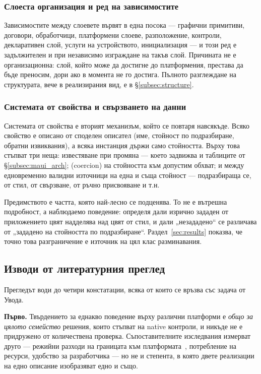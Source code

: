 \subsubsection{Слоеста организация и ред на зависимостите}
Зависимостите между слоевете вървят в една посока --- графични примитиви, договори,
обработчици, платформени слоеве, разположение, контроли, декларативен слой, услуги на
устройството, инициализация --- и този ред е задължителен и при независимо изграждане на
такъв слой. Причината не е организационна: слой, който може да достигне до платформения,
престава да бъде преносим, дори ако в момента не го достига. Пълното разглеждане на
структурата, вече в реализирания вид, е в §\ref{subsec:structure}.

\subsubsection{Системата от свойства и свързването на данни}
Системата от свойства е вторият механизъм, който се повтаря навсякъде. Всяко свойство е
описано от споделен описател (име, стойност по подразбиране, обратни извиквания), а всяка
инстанция държи само стойността. Върху това стъпват три неща: известяване при промяна ---
което задвижва и таблиците от §\ref{subsec:maui_arch};  (coercion) на
стойността към допустим обхват; и  между едновременно валидни източници на
една и съща стойност --- подразбираща се, от стил, от свързване, от ръчно присвояване и
т.н.

Предимството е частта, която най-лесно се подценява. То не е вътрешна подробност, а
наблюдаемо поведение: определя дали изрично зададен от приложението цвят надделява над
цвят от стил, и дали „незададено“ се различава от „зададено на стойността по
подразбиране“. Раздел~\ref{sec:results} показва, че точно това разграничение е източник
на цял клас разминавания.

\subsection{Изводи от литературния преглед}
\label{subsec:lit_summary}

Прегледът води до четири констатации, всяка от които се връзва със задача от Увода.

\textbf{Първо.} Твърдението за еднакво поведение върху различни платформи е \emph{общо за
цялото семейство} решения, които стъпват на native контроли, и никъде не е придружено от
количествена проверка. Съпоставителните изследвания измерват друго --- режийни разходи на
границата към платформата~\cite{biornhansen2020overhead}, потребление на ресурси, удобство
за разработчика --- но не и степента, в която двете реализации на едно описание изобразяват
едно и също.

